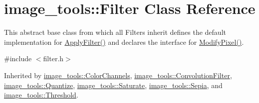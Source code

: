 \hypertarget{classimage__tools_1_1Filter}{}\section{image\+\_\+tools\+:\+:Filter Class Reference}
\label{classimage__tools_1_1Filter}


This abstract base class from which all Filters inherit defines the default implementation for \hyperlink{classimage__tools_1_1Filter_a109d756cc63f596508b3a8e02e89b4bf}{Apply\+Filter()} and declares the interface for \hyperlink{classimage__tools_1_1Filter_a2497414e1c1e232dd4e7db2ce2ab9f74}{Modify\+Pixel()}.  




{\ttfamily \#include $<$filter.\+h$>$}



Inherited by \hyperlink{classimage__tools_1_1ColorChannels}{image\+\_\+tools\+::\+Color\+Channels}, \hyperlink{classimage__tools_1_1ConvolutionFilter}{image\+\_\+tools\+::\+Convolution\+Filter}, \hyperlink{classimage__tools_1_1Quantize}{image\+\_\+tools\+::\+Quantize}, \hyperlink{classimage__tools_1_1Saturate}{image\+\_\+tools\+::\+Saturate}, \hyperlink{classimage__tools_1_1Sepia}{image\+\_\+tools\+::\+Sepia}, and \hyperlink{classimage__tools_1_1Threshold}{image\+\_\+tools\+::\+Threshold}.

